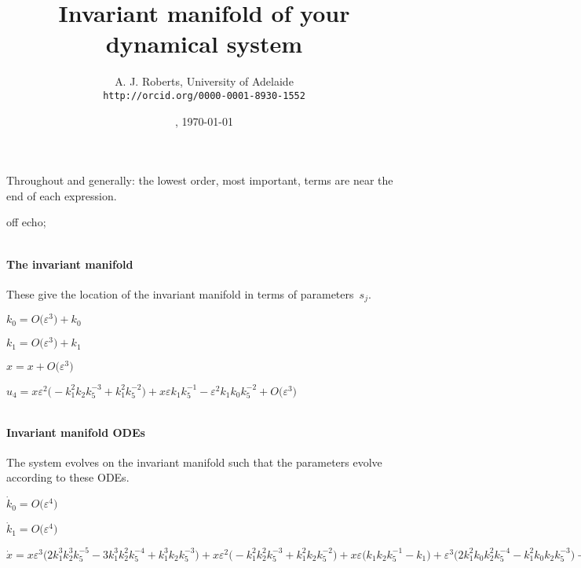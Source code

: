\documentclass[11pt,a5paper]{article}
\title{Invariant manifold of your dynamical system}
\author{A. J. Roberts, University of Adelaide\\
\texttt{http://orcid.org/0000-0001-8930-1552}}
\date{\now, \today}
\def\eps{\varepsilon} \def\_{_}
\begin{document}
\maketitle
Throughout and generally: the lowest order, most
important, terms are near the end of each expression.


off echo;

\(
\)
\paragraph{The invariant manifold}
These give the location of the invariant manifold in
terms of parameters~\(s\_ j\).
\(
\)\par
\(k_0=O\big(\varepsilon ^{3}\big)+k_0
\)\par
\(k_1=O\big(\varepsilon ^{3}\big)+k_1
\)\par
\(x=x+O\big(\varepsilon ^{3}\big)
\)\par
\(u_{4}=x \eps^{2} \big(-k_1^{2} k\_2 k\_5^{-3}+k_1^{2} k\_5^{-2}
\big)+x \eps k_1 k\_5^{-1}-\eps^{2} k_1 k_0 k\_5^{-2}+O\big(
\varepsilon ^{3}\big)
\)\par
\(
\)
\paragraph{Invariant manifold ODEs}
The system evolves on the invariant manifold such
that the parameters evolve according to these ODEs.
\(
\)\par
\(\dot k_0=O\big(\varepsilon ^{4}\big)
\)\par
\(\dot k_1=O\big(\varepsilon ^{4}\big)
\)\par
\(\dot x=x \eps^{3} \big(2 k_1^{3} k\_2^{3} k\_5^{-5}-3 k_1^{3
} k\_2^{2} k\_5^{-4}+k_1^{3} k\_2 k\_5^{-3}\big)+x \eps^{2} \big(-
k_1^{2} k\_2^{2} k\_5^{-3}+k_1^{2} k\_2 k\_5^{-2}\big)+x \eps 
\big(k_1 k\_2 k\_5^{-1}-k_1\big)+\eps^{3} \big(2 k_1^{2} k_0 
k\_2^{2} k\_5^{-4}-k_1^{2} k_0 k\_2 k\_5^{-3}\big)-\eps^{2} k_1 k_0 k\_2 k\_5^{-2}+\eps k_0+O\big(\varepsilon ^{4}\big)
\)\par
\(
\)
\end{document}
